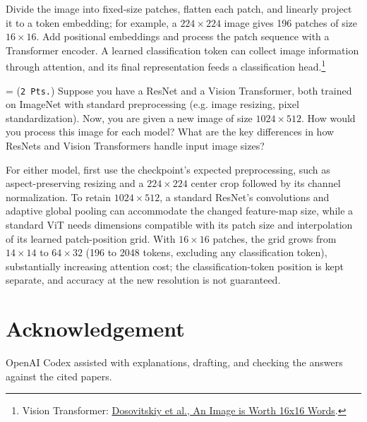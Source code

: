 \documentclass[11pt]{article}
\newcounter{qcounter}
\newlength{\qlabelwidth}
\newcommand{\question}{%
  \Needspace{7\baselineskip}%
  \refstepcounter{qcounter}%
  \par\noindent
  \makebox[\qlabelwidth][l]{\textbf{Q\arabic{qcounter}.}}%
  \hangindent=\qlabelwidth\hangafter=1%
}
\begin{document}
  \begin{solution}
  Divide the image into fixed-size patches, flatten each patch, and linearly project it to a token embedding; for example, a $224\times224$ image gives 196 patches of size $16\times16$. Add positional embeddings and process the patch sequence with a Transformer encoder. A learned classification token can collect image information through attention, and its final representation feeds a classification head.\footnote{Vision Transformer: \href{https://arxiv.org/abs/2010.11929}{Dosovitskiy et al., An Image is Worth 16x16 Words}.}
  \end{solution}
  
  \question (\texttt{2 Pts.})  Suppose you have a ResNet and a Vision Transformer, both trained on ImageNet with standard preprocessing (e.g. image resizing, pixel standardization). Now, you are given a new image of size $1024 \times 512$. How would you process this image for each model? What are the key differences in how ResNets and Vision Transformers handle input image sizes?

  \begin{solution}
  For either model, first use the checkpoint's expected preprocessing, such as aspect-preserving resizing and a $224\times224$ center crop followed by its channel normalization. To retain $1024\times512$, a standard ResNet's convolutions and adaptive global pooling can accommodate the changed feature-map size, while a standard ViT needs dimensions compatible with its patch size and interpolation of its learned patch-position grid. With $16\times16$ patches, the grid grows from $14\times14$ to $64\times32$ (196 to 2048 tokens, excluding any classification token), substantially increasing attention cost; the classification-token position is kept separate, and accuracy at the new resolution is not guaranteed.
  \end{solution}
  


\section*{Acknowledgement}
OpenAI Codex assisted with explanations, drafting, and checking the answers against the cited papers.
\end{document}
